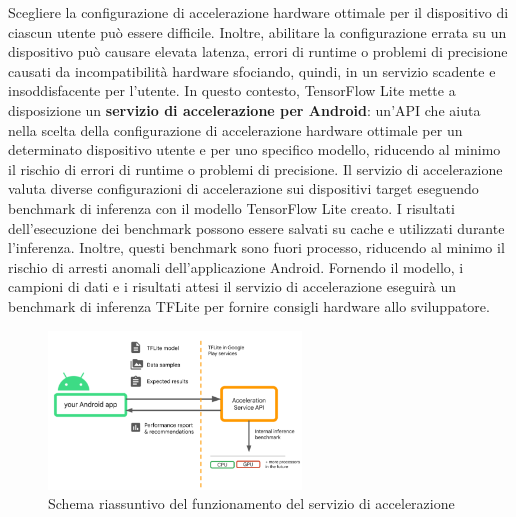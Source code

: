 Scegliere la configurazione di accelerazione hardware ottimale per il dispositivo di ciascun utente può essere difficile. Inoltre, abilitare la
configurazione errata su un dispositivo può causare elevata latenza, errori di runtime o problemi di precisione causati da incompatibilità hardware
sfociando, quindi, in un servizio scadente e insoddisfacente per l’utente. In questo contesto, TensorFlow Lite mette a disposizione un \textbf{servizio di
accelerazione per Android}: un'API che aiuta nella scelta della configurazione di accelerazione hardware ottimale per un determinato dispositivo utente e
per uno specifico modello, riducendo al minimo il rischio di errori di runtime o problemi di precisione.
Il servizio di accelerazione valuta diverse configurazioni di accelerazione sui dispositivi target eseguendo benchmark di inferenza con il modello
TensorFlow Lite creato. I risultati dell’esecuzione dei benchmark possono essere salvati su cache e utilizzati durante l’inferenza. Inoltre, questi
benchmark sono fuori processo, riducendo al minimo il rischio di arresti anomali dell’applicazione Android.
Fornendo il  modello, i campioni di dati e i risultati attesi il servizio di accelerazione eseguirà un benchmark di inferenza TFLite per fornire
consigli hardware allo sviluppatore.

\begin{figure}[ht]
    \centering
    \includegraphics[width=0.6\textwidth]{Immagini/accelerazione.png}
    \caption{Schema riassuntivo del funzionamento del servizio di accelerazione}
    \label{fig:accelerazione}
\end{figure}


